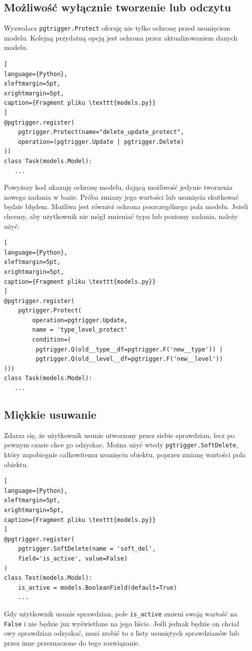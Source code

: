 \documentclass[oneside,polski,logo,indent]{amuthesis}
\begin{document}
\begin{enumerate}
\begin{enumerate}
\subsection{Możliwość wyłącznie tworzenie lub odczytu}
Wyzwalacz \texttt{pgtrigger.Protect} oferuję nie tylko ochronę przed usunięciem modelu. Kolejną przydatną opcją jest ochrona przez aktualizowaniem danych modelu.
\begin{lstlisting}[
language={Python},
xleftmargin=5pt,
xrightmargin=5pt,
caption={Fragment pliku \texttt{models.py}}
]
@pgtrigger.register(
    pgtrigger.Protect(name="delete_update_protect",
	operation=(pgtrigger.Update | pgtrigger.Delete)
))
class Task(models.Model):
   ...
\end{lstlisting}
Powyższy kod ukazuję ochronę modelu, dającą możliwość jedynie tworzenia nowego zadania w bazie. Próba zmiany jego wartości lub usunięcia skutkować będzie błędem. Możliwa jest również ochrona poszczególnego pola modelu.
Jeżeli chcemy, aby użytkownik nie mógł zmieniać typu lub poziomy zadania, należy użyć:

\begin{lstlisting}[
language={Python},
xleftmargin=5pt,
xrightmargin=5pt,
caption={Fragment pliku \texttt{models.py}}
]
@pgtrigger.register(
    pgtrigger.Protect(
        operation=pgtrigger.Update,
        name = 'type_level_protect'
        condition=(
         pgtrigger.Q(old__type__df=pgtrigger.F('new__type')) |
         pgtrigger.Q(old__level__df=pgtrigger.F('new__level'))
)))
class Task(models.Model):
   ...
\end{lstlisting}
\subsection{Miękkie usuwanie}
Zdarza się, że użytkownik usunie utworzony przez siebie sprawdzian, lecz po pewnym czasie chce go odzyskac. Można użyć wtedy \texttt{pgtrigger.SoftDelete}, który zapobiegnie całkowitemu usunięciu obiektu, poprzez zmianę wartości pola obiektu.
\begin{lstlisting}[
language={Python},
xleftmargin=5pt,
xrightmargin=5pt,
caption={Fragment pliku \texttt{models.py}}
]
@pgtrigger.register(
    pgtrigger.SoftDelete(name = 'soft_del',
	field='is_active', value=False)
)
class Test(models.Model):
    is_active = models.BooleanField(default=True)
    ... 
\end{lstlisting}
Gdy użytkownik usunie sprawdzian, pole \texttt{is\_active} zmieni swoją wartość na \texttt{False} i nie będzie juz wyświetlane na jego liście. Jeśli jednak będzie on chciał owy sprawdzian odzyskać, musi zrobić to z listy usuniętych sprawdzianów lub przez inne przeznaczone do tego rozwiązanie.

\end{enumerate}
\end{enumerate}
\end{document}
